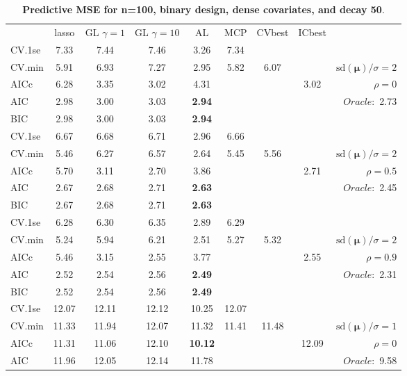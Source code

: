 \begin{table}\vspace{-.5cm}
\caption[l]{ { \bf Predictive MSE for n=100, binary design, 
dense covariates, and  decay  50}.}
\vspace{-.5cm}
\footnotesize{}
\begin{center}
\begin{tabular}{l*{7}{c}|r}
 & lasso & GL $\gamma=1$ & GL $\gamma=10$ & AL & MCP  & CVbest & ICbest  \\
\cline{1-9}
CV.1se & 7.33 & 7.44 & 7.46 & 3.26 & 7.34 & & & \\
CV.min & 5.91 & 6.93 & 7.27 & 2.95 & 5.82 & 6.07 & & $\mathrm{sd}(\mathbf{\mu})/\sigma=2$ \\
AICc & 6.28 & 3.35 & 3.02 & 4.31 & & & 3.02 &  $\rho=0$ \\
AIC & 2.98 & 3.00 & 3.03 & {\bf 2.94} & & & &  \multirow{2}{*}{$Oracle: $ 2.73} \\
BIC & 2.98 & 3.00 & 3.03 & {\bf 2.94} & & & &  \\
 \hline 
CV.1se & 6.67 & 6.68 & 6.71 & 2.96 & 6.66 & & & \\
CV.min & 5.46 & 6.27 & 6.57 & 2.64 & 5.45 & 5.56 & & $\mathrm{sd}(\mathbf{\mu})/\sigma=2$ \\
AICc & 5.70 & 3.11 & 2.70 & 3.86 & & & 2.71 &  $\rho=0.5$ \\
AIC & 2.67 & 2.68 & 2.71 & {\bf 2.63} & & & &  \multirow{2}{*}{$Oracle: $ 2.45} \\
BIC & 2.67 & 2.68 & 2.71 & {\bf 2.63} & & & &  \\
 \hline 
CV.1se & 6.28 & 6.30 & 6.35 & 2.89 & 6.29 & & & \\
CV.min & 5.24 & 5.94 & 6.21 & 2.51 & 5.27 & 5.32 & & $\mathrm{sd}(\mathbf{\mu})/\sigma=2$ \\
AICc & 5.46 & 3.15 & 2.55 & 3.77 & & & 2.55 &  $\rho=0.9$ \\
AIC & 2.52 & 2.54 & 2.56 & {\bf 2.49} & & & &  \multirow{2}{*}{$Oracle: $ 2.31} \\
BIC & 2.52 & 2.54 & 2.56 & {\bf 2.49} & & & &  \\
 \hline 
CV.1se & 12.07 & 12.11 & 12.12 & 10.25 & 12.07 & & & \\
CV.min & 11.33 & 11.94 & 12.07 & 11.32 & 11.41 & 11.48 & & $\mathrm{sd}(\mathbf{\mu})/\sigma=1$ \\
AICc & 11.31 & 11.06 & 12.10 & {\bf 10.12} & & & 12.09 &  $\rho=0$ \\
AIC & 11.96 & 12.05 & 12.14 & 11.78 & & & &  \multirow{2}{*}{$Oracle: $ 9.58} \\

\end{tabular}
\end{center}
\end{table}
